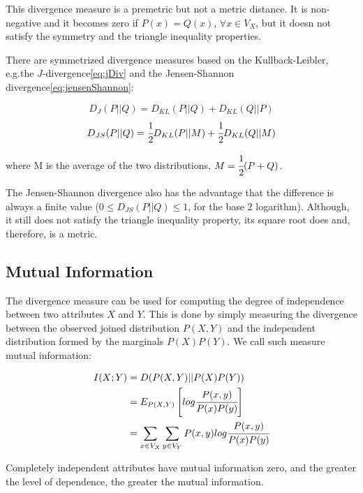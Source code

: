 This divergence measure is a premetric but not a metric distance. It is non-negative and it becomes zero if $P(x)=Q(x)$,
$\forall x \in V_X$, but it doesn not satisfy the symmetry and the triangle inequality properties.

There are symmetrized divergence measures based on the Kullback-Leibler, e.g.the $J$-divergence\ref{eq:jDiv} and the
Jensen-Shannon divergence\ref{eq:jensenShannon}:

\begin{equation} \label{eq:jDiv}
  D_{J}(P||Q) = D_{KL}(P||Q) + D_{KL}(Q||P)
\end{equation}
\begin{equation} \label{eq:jensenShannon}
  D_{JS}(P||Q) = \cfrac{1}{2}D_{KL}(P||M) + \cfrac{1}{2}D_{KL}(Q||M)
\end{equation}

where M is the average of the two distributions, $M=\cfrac{1}{2}(P+Q)$.

The Jensen-Shannon divergence also has the advantage that the difference is always a finite value ($0 \leq
D_{JS}(P||Q) \leq 1$, for the base 2 logarithm). Although, it still does not satisfy the triangle inequality property,
its square root does and, therefore, is a metric.

\subsection{Mutual Information}

The divergence measure can be used for computing the degree of independence between two attributes $X$ and $Y$. This is
done by simply measuring the divergence between the observed joined distribution $P(X,Y)$ and the independent
distribution formed by the marginals $P(X)P(Y)$. We call such measure mutual information:

\begin{equation} \label{eq:mutualInformation}
\begin{split}
 I(X;Y)&=D(P(X,Y)||P(X)P(Y)) \\
 &=E_{P(X,Y)}\left[ log\cfrac{P(x,y)}{P(x)P(y)} \right] \\
 &=\sum_{x \in V_X} \sum_{y \in V_Y} P(x,y)log\cfrac{P(x,y)}{P(x)P(y)}
\end{split}
\end{equation}

Completely independent attributes have mutual information zero, and the greater the level of dependence, the greater
the mutual information.


